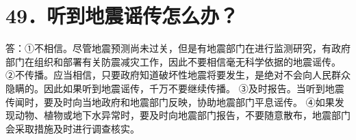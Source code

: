 \documentclass[a4paper,12pt,english]{sphinxmanual}
\begin{document}
\section{49．听到地震谣传怎么办？}
\label{\detokenize{index:id55}}
答：①不相信。尽管地震预测尚未过关，但是有地震部门在进行监测研究，有政府部门在组织和部署有关防震减灾工作，因此不要相信毫无科学依据的地震谣传。
②不传播。应当相信，只要政府知道破坏性地震将要发生，是绝对不会向人民群众隐瞒的。因此如果听到地震谣传，千万不要继续传播。
③及时报告。当听到地震传闻时，要及时向当地政府和地震部门反映，协助地震部门平息谣传。
④如果发现动物、植物或地下水异常时，要及时向地震部门报告，不要随意散布，地震部门会采取措施及时进行调查核实。



\renewcommand{\indexname}{Index}
\printindex
\end{document}
